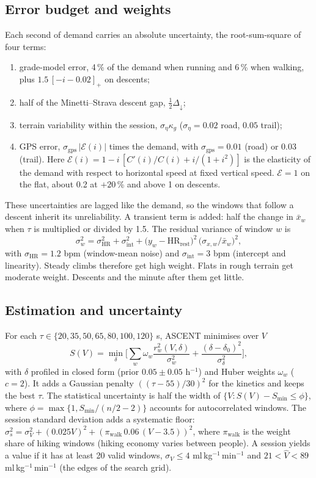 \documentclass[11pt,a4paper]{article}
\newcommand{\unit}{ml\,kg$^{-1}$\,min$^{-1}$}
\newcommand{\HRrest}{\ensuremath{\mathrm{HR}_{\mathrm{rest}}}}
\newcommand{\ascent}{ASCENT}
\begin{document}
\subsection{Error budget and weights}\label{sec:weights}
Each second of demand carries an absolute uncertainty, the root-sum-square of four terms:
\begin{enumerate}[label=(\alph*),leftmargin=*]
\item grade-model error, 4\,\% of the demand when running and 6\,\% when walking, plus $1.5\,[-i-0.02]_+$ on descents;
\item half of the Minetti--Strava descent gap, $\tfrac12\Delta_\downarrow$;
\item terrain variability within the session, $\sigma_\eta\kappa_g$ ($\sigma_\eta=0.02$ road, $0.05$ trail);
\item GPS error, $\sigma_{\mathrm{gps}}\,|\mathcal E(i)|$ times the demand, with $\sigma_{\mathrm{gps}}=0.01$ (road) or $0.03$ (trail). Here $\mathcal E(i)=1-i\,[C'(i)/C(i)+i/(1+i^2)]$ is the elasticity of the demand with respect to horizontal speed at fixed vertical speed. $\mathcal E=1$ on the flat, about 0.2 at $+20$\,\% and above 1 on descents.
\end{enumerate}
These uncertainties are lagged like the demand, so the windows that follow a descent inherit its unreliability. A transient term is added: half the change in $\bar x_w$ when $\tau$ is multiplied or divided by 1.5. The residual variance of window $w$ is
\begin{equation}
\sigma_w^2=\sigma_{\mathrm{HR}}^2+\sigma_{\mathrm{int}}^2+\big(y_w-\HRrest\big)^2\,\big(\sigma_{x,w}/\bar x_w\big)^2,
\end{equation}
with $\sigma_{\mathrm{HR}}=1.2$ bpm (window-mean noise) and $\sigma_{\mathrm{int}}=3$ bpm (intercept and linearity). Steady climbs therefore get high weight. Flats in rough terrain get moderate weight. Descents and the minute after them get little.

\subsection{Estimation and uncertainty}
For each $\tau\in\{20,35,50,65,80,100,120\}$ s, \ascent{} minimises over $V$
\begin{equation}
S(V)=\min_{\delta}\Big[\sum_w \omega_w\frac{r_w^2(V,\delta)}{\sigma_w^2}+\frac{(\delta-\delta_0)^2}{\sigma_\delta^2}\Big],
\end{equation}
with $\delta$ profiled in closed form (prior $0.05\pm0.05$ h$^{-1}$) and Huber weights $\omega_w$ ($c=2$). It adds a Gaussian penalty $((\tau-55)/30)^2$ for the kinetics \citep{hunt2015} and keeps the best $\tau$. The statistical uncertainty is half the width of $\{V:S(V)-S_{\min}\le\phi\}$, where $\phi=\max\{1,S_{\min}/(n/2-2)\}$ accounts for autocorrelated windows. The session standard deviation adds a systematic floor: $\sigma_s^2=\sigma_V^2+(0.025V)^2+(\pi_{\mathrm{walk}}\,0.06\,(V-3.5))^2$, where $\pi_{\mathrm{walk}}$ is the weight share of hiking windows (hiking economy varies between people). A session yields a value if it has at least 20 valid windows, $\sigma_V\le4$ \unit{} and $21<\hat V<89$ \unit{} (the edges of the search grid).
\end{document}
